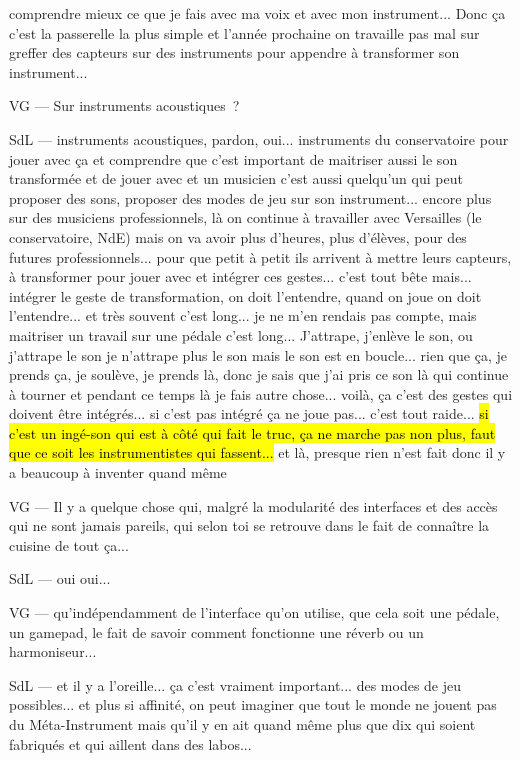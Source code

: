 comprendre mieux ce que je fais avec ma voix et avec mon instrument... Donc ça c'est la passerelle la plus simple et l'année prochaine on travaille pas mal sur greffer des capteurs sur des instruments pour appendre à transformer son instrument... 

VG — Sur instruments acoustiques ? 

SdL — instruments acoustiques, pardon, oui... instruments du conservatoire pour jouer avec ça et comprendre que c'est important de maitriser aussi le son transformée et de jouer avec et un musicien c'est aussi quelqu'un qui peut proposer des sons, proposer des modes de jeu sur son instrument... encore plus sur des musiciens professionnels, là on continue à travailler avec Versailles (le conservatoire, NdE) mais on va avoir plus d'heures, plus d'élèves, pour des futures professionnels... pour que petit à petit ils arrivent à mettre leurs capteurs, à transformer pour jouer avec et intégrer ces gestes... c'est tout bête mais... intégrer le geste de transformation, on doit l'entendre, quand on joue on doit l'entendre... et très souvent c'est long... je ne m'en rendais pas compte, mais maitriser un travail sur une pédale c'est long... J'attrape, j'enlève le son, ou j'attrape le son je n'attrape plus le son mais le son est en boucle... rien que ça, je prends ça, je soulève, je prends là, donc je sais que j'ai pris ce son là qui continue à tourner et pendant ce temps là je fais autre chose... voilà, ça c'est des gestes qui doivent être intégrés... si c'est pas intégré ça ne joue pas... c'est tout raide... \hl{si c'est un ingé-son qui est à côté qui fait le truc, ça ne marche pas non plus, faut que ce soit les instrumentistes qui fassent...} et là, presque rien n'est fait donc il y a beaucoup à inventer quand même 

VG — Il y a quelque chose qui, malgré la modularité des interfaces et des accès qui ne sont jamais pareils, qui selon toi se retrouve dans le fait de connaître la cuisine de tout ça... 

SdL — oui oui... 

VG — qu'indépendamment de l'interface qu'on utilise, que cela soit une pédale, un gamepad, le fait de savoir comment fonctionne une réverb ou un harmoniseur... 

SdL — et il y a l'oreille... ça c'est vraiment important... des modes de jeu possibles... et plus si affinité, on peut imaginer que tout le monde ne jouent pas du Méta-Instrument mais qu'il y en ait quand même plus que dix qui soient fabriqués et qui aillent dans des labos... 

